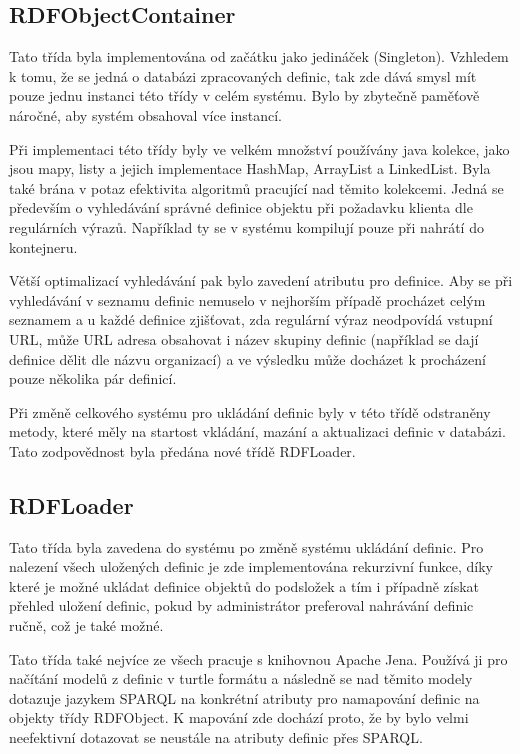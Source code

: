 \documentclass[thesis=B,czech]{FITthesis}[2012/06/26]
\begin{document}
  \subsection{RDFObjectContainer}
  Tato třída byla implementována od začátku jako jedináček (Singleton). Vzhledem k tomu, že se jedná o databázi zpracovaných definic, tak zde dává smysl mít pouze
  jednu instanci této třídy v celém systému. Bylo by zbytečně paměťově náročné, aby systém obsahoval více instancí.
  
  Při implementaci této třídy byly ve velkém množství používány java kolekce, jako jsou mapy, listy a jejich implementace HashMap, ArrayList a LinkedList.
  Byla také brána v potaz efektivita algoritmů pracující nad těmito kolekcemi. Jedná se především o vyhledávání správné definice objektu při požadavku klienta
  dle regulárních výrazů. Například ty se v systému kompilují pouze při nahrátí do kontejneru.
  
  Větší optimalizací vyhledávání pak bylo zavedení atributu  pro definice. Aby se při vyhledávání v seznamu definic nemuselo v nejhorším případě 
  procházet celým seznamem a u každé definice zjišťovat, zda regulární výraz neodpovídá vstupní URL, může URL adresa obsahovat i název skupiny definic (například
  se dají definice dělit dle názvu organizací) a ve výsledku může docházet k procházení pouze několika pár definicí.
    
  Při změně celkového systému pro ukládání definic byly v této třídě odstraněny metody, které měly na startost vkládání, 
  mazání a aktualizaci definic v databázi. Tato zodpovědnost byla předána nové třídě RDFLoader.	
  
  \subsection{RDFLoader}
  Tato třída byla zavedena do systému po změně systému ukládání definic. Pro nalezení všech uložených definic je zde implementována rekurzivní funkce, 
  díky které je možné ukládat definice objektů do podsložek a tím i případně získat přehled uložení definic, pokud by administrátor preferoval nahrávání definic
  ručně, což je také možné.
  
  Tato třída také nejvíce ze všech pracuje s knihovnou Apache Jena. Používá ji pro načítání modelů z definic v turtle formátu a následně se nad těmito
  modely dotazuje jazykem SPARQL na konkrétní atributy pro namapování definic na objekty třídy RDFObject. K mapování zde dochází proto, že by bylo velmi neefektivní
  dotazovat se neustále na atributy definic přes SPARQL.
  
\end{document}
